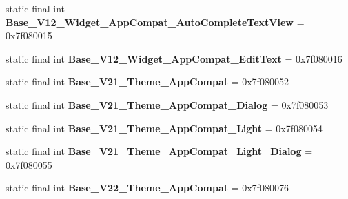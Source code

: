 \begin{DoxyCompactItemize}
\item 
\hypertarget{classandroid_1_1support_1_1v7_1_1appcompat_1_1_r_1_1style_a682c0f421ce2001f69e38cfda1f240ac}{}static final int {\bfseries Base\+\_\+\+V12\+\_\+\+Widget\+\_\+\+App\+Compat\+\_\+\+Auto\+Complete\+Text\+View} = 0x7f080015\label{classandroid_1_1support_1_1v7_1_1appcompat_1_1_r_1_1style_a682c0f421ce2001f69e38cfda1f240ac}

\item 
\hypertarget{classandroid_1_1support_1_1v7_1_1appcompat_1_1_r_1_1style_ab40953d122f2cd8de7a74f8c39fea2e0}{}static final int {\bfseries Base\+\_\+\+V12\+\_\+\+Widget\+\_\+\+App\+Compat\+\_\+\+Edit\+Text} = 0x7f080016\label{classandroid_1_1support_1_1v7_1_1appcompat_1_1_r_1_1style_ab40953d122f2cd8de7a74f8c39fea2e0}

\item 
\hypertarget{classandroid_1_1support_1_1v7_1_1appcompat_1_1_r_1_1style_a8cb8846ccd9a78ed3b5c7cfff9c64b53}{}static final int {\bfseries Base\+\_\+\+V21\+\_\+\+Theme\+\_\+\+App\+Compat} = 0x7f080052\label{classandroid_1_1support_1_1v7_1_1appcompat_1_1_r_1_1style_a8cb8846ccd9a78ed3b5c7cfff9c64b53}

\item 
\hypertarget{classandroid_1_1support_1_1v7_1_1appcompat_1_1_r_1_1style_af12a4babdfe3ab610b0d241598adcf1d}{}static final int {\bfseries Base\+\_\+\+V21\+\_\+\+Theme\+\_\+\+App\+Compat\+\_\+\+Dialog} = 0x7f080053\label{classandroid_1_1support_1_1v7_1_1appcompat_1_1_r_1_1style_af12a4babdfe3ab610b0d241598adcf1d}

\item 
\hypertarget{classandroid_1_1support_1_1v7_1_1appcompat_1_1_r_1_1style_a4376f811c6c223511a27dd5c2729e9e0}{}static final int {\bfseries Base\+\_\+\+V21\+\_\+\+Theme\+\_\+\+App\+Compat\+\_\+\+Light} = 0x7f080054\label{classandroid_1_1support_1_1v7_1_1appcompat_1_1_r_1_1style_a4376f811c6c223511a27dd5c2729e9e0}

\item 
\hypertarget{classandroid_1_1support_1_1v7_1_1appcompat_1_1_r_1_1style_aeb190b7df390f0ef6a3f546f6218e70c}{}static final int {\bfseries Base\+\_\+\+V21\+\_\+\+Theme\+\_\+\+App\+Compat\+\_\+\+Light\+\_\+\+Dialog} = 0x7f080055\label{classandroid_1_1support_1_1v7_1_1appcompat_1_1_r_1_1style_aeb190b7df390f0ef6a3f546f6218e70c}

\item 
\hypertarget{classandroid_1_1support_1_1v7_1_1appcompat_1_1_r_1_1style_a7e00a5c99ed370c04f91b6082c20eab7}{}static final int {\bfseries Base\+\_\+\+V22\+\_\+\+Theme\+\_\+\+App\+Compat} = 0x7f080076\label{classandroid_1_1support_1_1v7_1_1appcompat_1_1_r_1_1style_a7e00a5c99ed370c04f91b6082c20eab7}


\end{DoxyCompactItemize}
